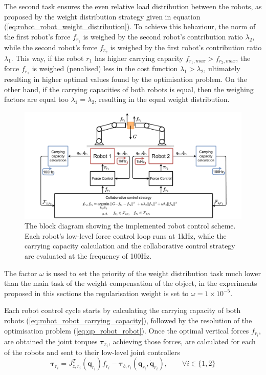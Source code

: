 The second task ensures the even relative load distribution between the robots, as proposed by the weight distribution strategy given in equation (\ref{eq:robot_robot_weight_distribution}). To achieve this behaviour, the norm of the first robot's force $f_{r_1}$ is weighed by the second robot's contribution ratio $\lambda_2$, while the second robot's force $f_{r_2}$ is weighed by the first robot's contribution ratio $\lambda_1$. This way, if the robot $r_1$ has higher carrying capacity $f_{r_1,max}>f_{r_2,max}$, the force $f_{r_1}$ is weighed (penalised) less in the cost function $\lambda_1>\lambda_2$, ultimately resulting in higher optimal values found by the optimisation problem. On the other hand, if the carrying capacities of both robots is equal, then the weighing factors are equal too $\lambda_1=\lambda_2$, resulting in the equal weight distribution. 

\begin{figure}[!b]
    \centering
    \includegraphics[width=\linewidth]{Papers/images/schema_robot_robot.pdf}
    \caption{The block diagram showing the implemented robot control scheme. Each robot's low-level force control loop runs at 1kHz, while the carrying capacity calculation and the collaborative control strategy are evaluated at the frequency of 100Hz.}
    \label{fig:schema_robot_robot_control}
\end{figure}

The factor $\omega$ is used to set the priority of the weight distribution task much lower than the main task of the weight compensation of the object, in the experiments proposed in this sections the regularisation weight is set to $\omega=1\times 10^{-5}$.

Each robot control cycle starts by calculating the carrying capacity of both robots (\ref{eq:robot_robot_carrying_capacity}), followed by the resolution of the optimisation problem (\ref{eq:qp_robot_robot}). Once the optimal vertical forces $f_{r_i}$, are obtained the joint torques $\bm{\tau}_{r_i}$, achieving those forces, are calculated for each of the robots and sent to their low-level joint controllers 
\begin{equation}
    \bm{\tau}_{r_i} = J_{z,r_i}^T(\bm{q}_{r_i}){f}_{r_i} - \bm{\tau}_{b,r_i}(\bm{q}_{r_i},\dot{\bm{q}}_{r_i}), \qquad \forall i \in \{1,2\}
\end{equation}


